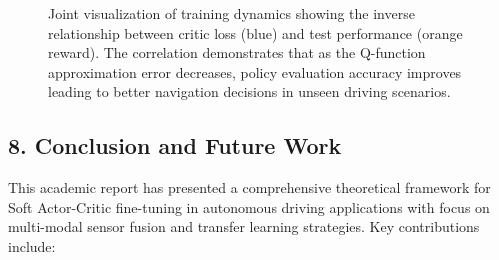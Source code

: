 \documentclass[10pt,a4paper,twocolumn]{article}
\begin{document}
\begin{figure}[h]
    \centering
    \caption{Joint visualization of training dynamics showing the inverse relationship between critic loss (blue) and test performance (orange reward). The correlation demonstrates that as the Q-function approximation error decreases, policy evaluation accuracy improves leading to better navigation decisions in unseen driving scenarios.}
    \label{fig:training_performance}
\end{figure}

\vfill

\subsection*{8. Conclusion and Future Work}

This academic report has presented a comprehensive theoretical framework for Soft Actor-Critic fine-tuning in autonomous driving applications with focus on multi-modal sensor fusion and transfer learning strategies. Key contributions include:
\end{document}

